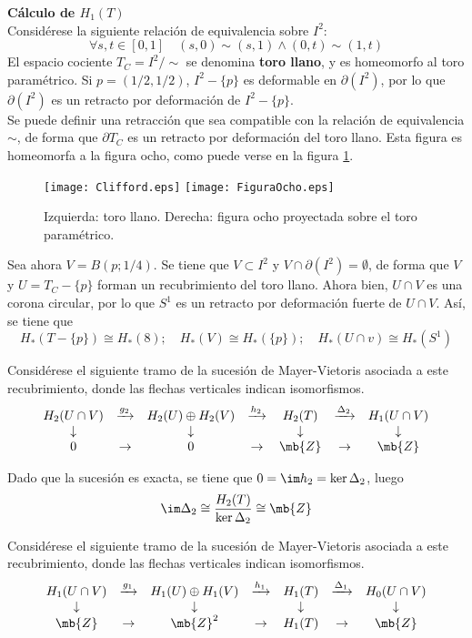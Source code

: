 \noindent\textbf{Cálculo de $H_1(T)$}
\\
Considérese la siguiente relación de equivalencia sobre $I^2$: $$\forall s,t \in [0,1] \quad (s,0) \sim (s,1) \land (0,t) \sim (1,t)$$ El espacio cociente $T_C=I^2/\sim$ se denomina \textbf{toro llano}, y es homeomorfo al toro paramétrico. Si $p=(1/2,1/2)$, $I^2-\{p\}$ es deformable en $\partial(I^2)$, por lo que $\partial(I^2)$ es un retracto por deformación de $I^2-\{p\}$.
\\

Se puede definir una retracción que sea compatible con la relación de equivalencia $\sim$, de forma que $\partial T_C$ es un retracto por deformación del toro llano. Esta figura es homeomorfa a la figura ocho, como puede verse en la figura \ref{fig8}.
\\

\begin{figure}[h]
\centering
\texttt{[image: Clifford.eps]}\hspace{2cm}
\texttt{[image: FiguraOcho.eps]}
\caption{\label{fig8}Izquierda: toro llano. Derecha: figura ocho proyectada sobre el toro paramétrico.}
\end{figure}

Sea ahora $V=B(p;1/4)$. Se tiene que $V \subset I^2$ y $V\cap\partial (I^2)=\emptyset$, de forma que $V$ y $U=T_C-\{p\}$ forman un recubrimiento del toro llano. Ahora bien, $U \cap V$ es una corona circular, por lo que $S^1$ es un retracto por deformación fuerte de $U \cap V$. Así, se tiene que $$H_*(T-\{p\}) \cong H_*(8); \quad H_*(V) \cong H_*(\{p\}); \quad H_*(U \cap v) \cong H_*(S^1)$$

Considérese el siguiente tramo de la sucesión de Mayer-Vietoris asociada a este recubrimiento, donde las flechas verticales indican isomorfismos.
\[\begin{array}{ccccccc}
H_2(U \cap V)	&\xrightarrow{g_2}	&H_2(U)\oplus H_2(V)	&\xrightarrow{h_2}	& H_2(T)		&\xrightarrow{\Delta_2}&H_1(U \cap V)\\
\downarrow		&					&\downarrow			&					&\downarrow	&					&\downarrow\\
0				&\rightarrow			&0					&\rightarrow			&\mb{Z}		&\rightarrow			&\mb{Z}
\end{array}\]

Dado que la sucesión es exacta, se tiene que $0=\im h_2=\ker \Delta_2$, luego $$\im \Delta_2\cong \frac{H_2(T)}{\ker \Delta_2} \cong \mb{Z}$$

Considérese el siguiente tramo de la sucesión de Mayer-Vietoris asociada a este recubrimiento, donde las flechas verticales indican isomorfismos.
\[\begin{array}{ccccccc}
H_1(U \cap V)	&\xrightarrow{g_1}	&H_1(U)\oplus H_1(V)	&\xrightarrow{h_1}	&H_1(T)		&\xrightarrow{\Delta_1}&H_0(U \cap V)\\
\downarrow		&					&\downarrow			&					&\downarrow	&					&\downarrow\\
\mb{Z}		&\rightarrow			&\mb{Z}^2			&\rightarrow			&H_1(T)		&\rightarrow			&\mb{Z}
\end{array}\]

